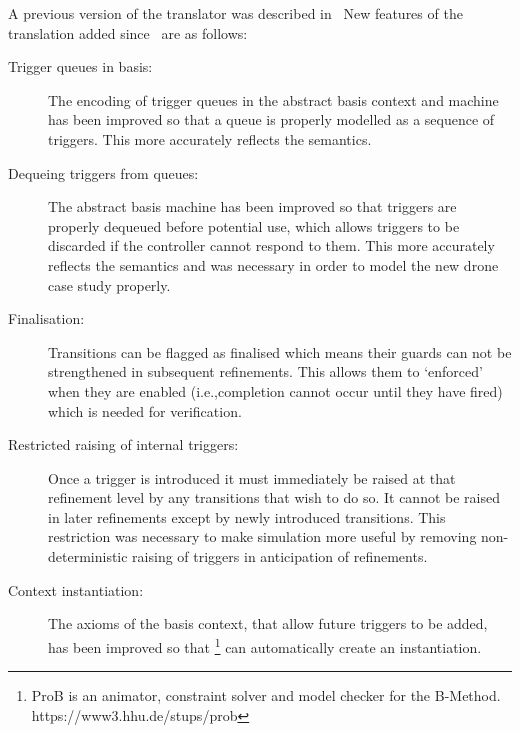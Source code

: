 
 A previous version of the translator was described in~\cite{MoSnHo18,detect2020} New features of the translation added since~\cite{MoSnHo18,detect2020} are as follows:
 \begin{description}
 \item[Trigger queues in basis:]
 	\begin{sloppypar}
 		The encoding of trigger queues in the abstract basis context and machine has been improved so that a queue is properly modelled as a sequence of triggers.
 		This more accurately reflects the \SCXML semantics.
 	\end{sloppypar}
 \item[Dequeing triggers from queues:]
   \begin{sloppypar}
     The abstract basis machine has been improved so that triggers are properly dequeued before potential use,
     which allows triggers to be discarded if the controller cannot respond to them. 
     This more accurately reflects the \SCXML semantics and was necessary in order to model the new drone case study properly.
   \end{sloppypar}

 \item[Finalisation:] Transitions can be flagged as finalised which means their guards can not be strengthened in subsequent refinements. This allows them to `enforced' when they are enabled (i.e.,completion cannot occur until they have fired) which is needed for verification. 

 \item[Restricted raising of internal triggers:] Once a trigger is introduced it must immediately be raised at that refinement level by any transitions that wish to do so. It cannot be raised in later refinements except by newly introduced transitions. This restriction was necessary to make simulation more useful by removing non-deterministic raising of triggers in anticipation of refinements.

 \item[Context instantiation:] The axioms of the basis context, that allow future triggers to be added, has been improved so that \PROB\footnote{ProB is an animator, constraint solver and model checker for the B-Method. https://www3.hhu.de/stups/prob} can automatically create an instantiation. 

 \end{description}

